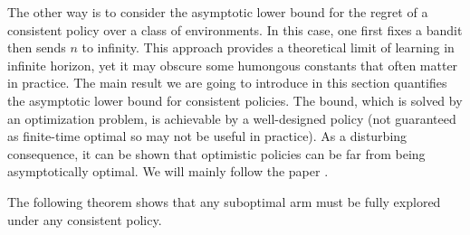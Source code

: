 \documentclass[10pt,a4article]{amsart}
\numberwithin{equation}{section}
\theoremstyle{plain}
\theoremstyle{definition}
\begin{document}
The other way is to consider the asymptotic lower bound for the regret of a consistent policy over a class of environments.  In this case, one first fixes a bandit then sends $n$ to infinity. This approach provides a theoretical limit of learning in infinite horizon, yet it may obscure some humongous constants that often matter in practice. The main result we are going to introduce in this section quantifies the asymptotic lower bound for consistent policies. The bound, which is solved by an optimization problem, is achievable by a well-designed policy (not guaranteed as finite-time optimal so may not be useful in practice).  As a disturbing consequence, it can be shown that optimistic policies can be far from being asymptotically optimal. We will mainly follow the paper \cite{lattimore2016end}. 

The following theorem shows that any suboptimal arm must be fully explored under any consistent policy. 
\end{document}
